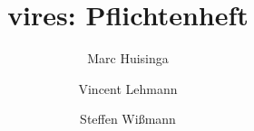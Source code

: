 \documentclass[a4paper,titlepage]{article}
\begin{document}
\author{Marc Huisinga \and Vincent Lehmann \and Steffen Wißmann}
\title{vires: Pflichtenheft}

\maketitle
\tableofcontents

\begin{abstract}

\end{abstract}

\end{document}
